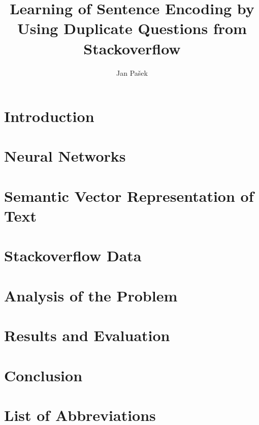 \documentclass[english,BP]{thesiskiv}
\author{Jan Pašek}
\title{Learning of Sentence Encoding by Using Duplicate Questions from Stackoverflow}
\begin{document}
%
\maketitle
\tableofcontents

\chapter{Introduction}


\chapter{Neural Networks}\label{NN}


\chapter{Semantic Vector Representation of Text}\label{vector_repr_chapter}


\chapter{Stackoverflow Data}\label{dataset}


\chapter{Analysis of the Problem}\label{analysis}


\chapter{Results and Evaluation}\label{results}


\chapter{Conclusion}


\chapter*{List of Abbreviations}

 
% 
%
%

{\raggedright\small

}
\end{document}
